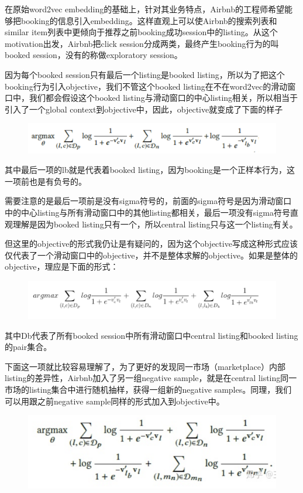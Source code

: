 \documentclass[12pt]{article}
\begin{document}
在原始word2vec embedding的基础上，针对其业务特点，Airbnb的工程师希望能够把booking的信息引入embedding。这样直观上可以使Airbnb的搜索列表和similar item列表中更倾向于推荐之前booking成功session中的listing。从这个motivation出发，Airbnb把click session分成两类，最终产生booking行为的叫booked session，没有的称做exploratory session。

因为每个booked session只有最后一个listing是booked listing，所以为了把这个booking行为引入objective，我们不管这个booked listing在不在word2vec的滑动窗口中，我们都会假设这个booked listing与滑动窗口的中心listing相关，所以相当于引入了一个global context到objective中，因此，objective就变成了下面的样子
\begin{figure}[H]
    \centering
    \includegraphics[width=1\textwidth]{fig/Airbnb_Click_Objetive2.png}
\end{figure}

其中最后一项的lb就是代表着booked listing，因为booking是一个正样本行为，这一项前也是有负号的。

需要注意的是最后一项前是没有sigma符号的，前面的sigma符号是因为滑动窗口中的中心listing与所有滑动窗口中的其他listing都相关，最后一项没有sigma符号直观理解是因为booked listing只有一个，所以central listing只与这一个listing有关。

但这里的objective的形式我仍让是有疑问的，因为这个objective写成这种形式应该仅代表了一个滑动窗口中的objective，并不是整体求解的objective。如果是整体的objective，理应是下面的形式：
\begin{figure}[H]
    \centering
    \includegraphics[width=1\textwidth]{fig/Airbnb_Click_Objetive3.png}
\end{figure}

其中Db代表了所有booked session中所有滑动窗口中central listing和booked listing的pair集合。

下面这一项就比较容易理解了，为了更好的发现同一市场（marketplace）内部listing的差异性，Airbnb加入了另一组negative sample，就是在central listing同一市场的listing集合中进行随机抽样，获得一组新的negative samples。同理，我们可以用跟之前negative sample同样的形式加入到objective中。
\begin{figure}[H]
    \centering
    \includegraphics[width=1\textwidth]{fig/Airbnb_Click_Objetive4.png}
\end{figure}
\end{document}
